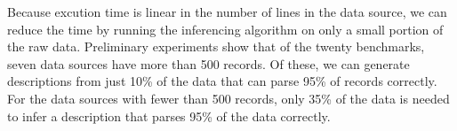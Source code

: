 Because excution time is linear in the
number of lines in the data source, we can reduce the time by
running the inferencing algorithm on only a small portion of the raw
data.
Preliminary experiments show that of the twenty benchmarks, seven data sources
have more than 500 records.  Of these, we can generate
descriptions from just 10\% of the data that can
parse 95\% of records correctly.
For the data sources with fewer than 500 records,
only 35\% of the data is needed to infer a description that parses
95\% of the data correctly.
